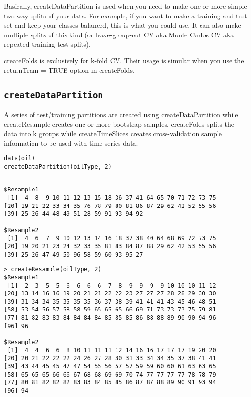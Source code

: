 \documentclass[caret-main.tex]{subfiles}
\begin{document}
Basically, createDataPartition is used when you need to make one or 
more simple two-way splits of your data. For example, if you want to 
make a training and test set and keep your classes balanced, this is 
what you could use. It can also make multiple splits of this kind (or 
leave-group-out CV aka Monte Carlos CV aka repeated training test 
splits). 

createFolds is exclusively for k-fold CV. Their usage is simular when 
you use the returnTrain = TRUE option in createFolds. 

\newpage
\subsection{\texttt{createDataPartition}}
A series of test/training partitions are created using createDataPartition while createResample creates one or more bootstrap samples. createFolds splits the data into k groups while createTimeSlices creates cross-validation sample information to be used with time series data.
\begin{framed}
\begin{verbatim}
data(oil)
createDataPartition(oilType, 2)
\end{verbatim}
\end{framed}
\begin{verbatim}

$Resample1
 [1]  4  8  9 10 11 12 13 15 18 36 37 41 64 65 70 71 72 73 75
[20] 19 21 22 33 34 35 76 78 79 80 81 86 87 29 62 42 52 55 56
[39] 25 26 44 48 49 51 28 59 91 93 94 92

$Resample2
 [1]  4  6  7  9 10 12 13 14 16 18 37 38 40 64 68 69 72 73 75
[20] 19 20 21 23 24 32 33 35 81 83 84 87 88 29 62 42 53 55 56
[39] 25 26 47 49 50 96 58 59 60 93 95 27
\end{verbatim}

\begin{verbatim}
> createResample(oilType, 2)
$Resample1
 [1]  2  3  5  5  6  6  6  6  7  8  9  9  9  9 10 10 10 11 12
[20] 13 14 16 16 19 20 21 21 22 22 23 27 27 27 28 28 29 30 30
[39] 31 34 34 35 35 35 35 36 37 38 39 41 41 41 43 45 46 48 51
[58] 53 54 56 57 58 58 59 65 65 65 66 69 71 73 73 73 75 79 81
[77] 81 82 83 83 84 84 84 84 85 85 85 86 88 88 89 90 90 94 96
[96] 96

$Resample2
 [1]  4  4  6  6  8 10 11 11 11 12 14 16 16 17 17 17 19 20 20
[20] 20 21 22 22 22 24 26 27 28 30 31 33 34 34 35 37 38 41 41
[39] 43 44 45 45 47 47 54 55 56 57 57 59 59 60 60 61 63 63 65
[58] 65 65 65 66 66 67 68 68 69 69 70 74 77 77 77 77 78 78 79
[77] 80 81 82 82 82 83 83 84 85 85 86 87 87 88 89 90 91 93 94
[96] 94

\end{verbatim}
\end{document}
